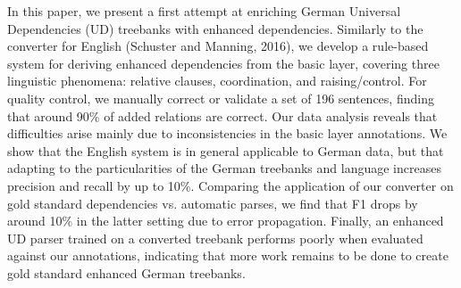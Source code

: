 In this paper, we present a first attempt at enriching German Universal Dependencies (UD) treebanks with enhanced dependencies. Similarly to the converter for English (Schuster and Manning, 2016), we develop a rule-based system for deriving enhanced dependencies from the basic layer, covering three linguistic phenomena: relative clauses, coordination, and raising/control. For quality control, we manually correct or validate a set of 196 sentences, finding that around 90\% of added relations are correct. Our data analysis reveals that difficulties arise mainly due to inconsistencies in the basic layer annotations. We show that the English system is in general applicable to German data, but that adapting to the particularities of the German treebanks and language increases precision and recall by up to 10\%. Comparing the application of our converter on gold standard dependencies vs. automatic parses, we find that F1 drops by around 10\% in the latter setting due to error propagation. Finally, an enhanced UD parser trained on a converted treebank performs poorly when evaluated against our annotations, indicating that more work remains to be done to create gold standard enhanced German treebanks.
